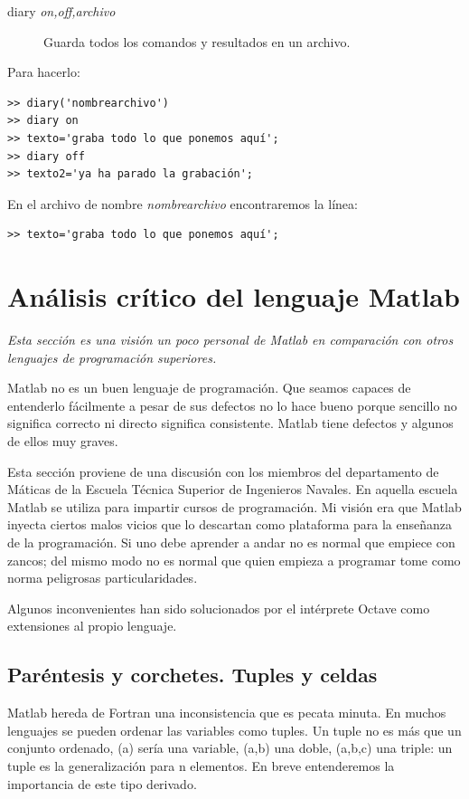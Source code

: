\begin{description}
\item [{diary \textsl{on,off,archivo}}]Guarda todos los
  comandos y resultados en un archivo.
\end{description}
Para hacerlo:

\begin{verbatim}
>> diary('nombrearchivo')
>> diary on
>> texto='graba todo lo que ponemos aquí';
>> diary off
>> texto2='ya ha parado la grabación';
\end{verbatim}

En el archivo de nombre \emph{nombrearchivo} encontraremos la línea:

\begin{verbatim}
>> texto='graba todo lo que ponemos aquí';
\end{verbatim}


\section{Análisis crítico del lenguaje Matlab}

\emph{Esta sección es una visión un poco personal de Matlab en
  comparación con otros lenguajes de programación superiores.}

Matlab no es un buen lenguaje de programación.  Que seamos capaces de
entenderlo fácilmente a pesar de sus defectos no lo hace bueno porque
sencillo no significa correcto ni directo significa consistente.
Matlab tiene defectos y algunos de ellos muy graves.

Esta sección proviene de una discusión con los miembros del
departamento de Máticas de la Escuela Técnica Superior de Ingenieros
Navales. En aquella escuela Matlab se utiliza para impartir cursos de
programación.  Mi visión era que Matlab inyecta ciertos malos vicios
que lo descartan como plataforma para la enseñanza de la
programación.  Si uno debe aprender a andar no es normal que empiece
con zancos; del mismo modo no es normal que quien empieza a
programar tome como norma peligrosas particularidades.

Algunos inconvenientes han sido solucionados por el intérprete Octave
como extensiones al propio lenguaje.

\subsection{Paréntesis y corchetes. Tuples y celdas}

Matlab hereda de Fortran una inconsistencia que es pecata minuta. En
muchos lenguajes se pueden ordenar las variables como tuples. Un tuple
no es más que un conjunto ordenado, (a) sería una variable, (a,b) una
doble, (a,b,c) una triple: un tuple es la generalización para n
elementos. En breve entenderemos la importancia de este tipo derivado.


